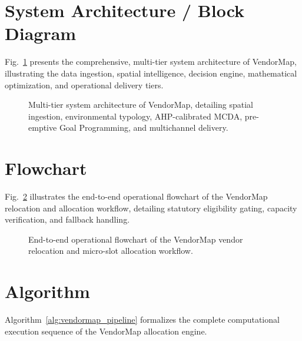 \section{System Architecture / Block Diagram}
\label{sec:architecture_diagram}

Fig.~\ref{fig:sys_architecture} presents the comprehensive, multi-tier system architecture of VendorMap, illustrating the data ingestion, spatial intelligence, decision engine, mathematical optimization, and operational delivery tiers.

\begin{figure}[htbp]
    \centering
    
    \caption{Multi-tier system architecture of VendorMap, detailing spatial ingestion, environmental typology, AHP-calibrated MCDA, pre-emptive Goal Programming, and multichannel delivery.}
    \label{fig:sys_architecture}
\end{figure}

\section{Flowchart}
\label{sec:flowchart}

Fig.~\ref{fig:sys_workflow} illustrates the end-to-end operational flowchart of the VendorMap relocation and allocation workflow, detailing statutory eligibility gating, capacity verification, and fallback handling.

\begin{figure}[htbp]
    \centering
    
    \caption{End-to-end operational flowchart of the VendorMap vendor relocation and micro-slot allocation workflow.}
    \label{fig:sys_workflow}
\end{figure}

\section{Algorithm}
\label{sec:algorithm}

Algorithm~\ref{alg:vendormap_pipeline} formalizes the complete computational execution sequence of the VendorMap allocation engine.

